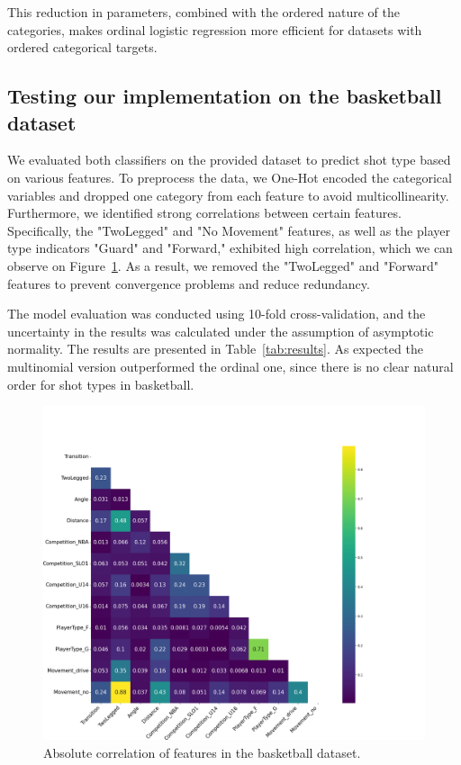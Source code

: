 \documentclass[9pt]{IEEEtran}
\begin{document}
  This reduction in parameters, combined with the ordered nature 
  of the categories, makes ordinal logistic regression more efficient
   for datasets with ordered categorical targets.

\subsection{Testing our implementation on the basketball dataset}
We evaluated both classifiers on the provided dataset to predict
 shot type based on various features. To preprocess the data, we One-Hot encoded 
 the categorical variables and dropped one category from each feature
  to avoid multicollinearity. Furthermore, we identified strong correlations
   between certain features. Specifically, the "TwoLegged" and "No Movement"
    features, as well as the player type indicators "Guard" and "Forward,"
     exhibited high correlation, which we can observe on Figure~\ref{fig:corr}. As a result, we removed the "TwoLegged" 
     and "Forward" features to prevent convergence problems and reduce 
     redundancy.

The model evaluation was conducted using 10-fold cross-validation, 
and the uncertainty in the results was calculated under the assumption 
of asymptotic normality. The results are presented in 
Table~\ref{tab:results}. As expected the multinomial version outperformed the 
ordinal one, since there is no clear natural order for shot types in 
basketball.


\begin{figure}[h]
    \centering
    \includegraphics[width=0.99\columnwidth]{figures/corr.png}
    \caption{Absolute correlation of features in the basketball dataset.}
    \label{fig:corr}
\end{figure}
\end{document}
